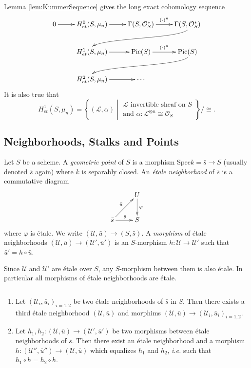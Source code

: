 Lemma \ref{lem:KummerSequence} gives the long exact cohomology sequence
$$
\xymatrix{
0  \ar[r] & H_{et}^0(S, \mu_n) \ar[r] & \Gamma(S, \mathcal{O}_S^*) \ar^{(\cdot)^n}[r] & \Gamma(S, \mathcal{O}_S^*) 
\ar@(rd,ul)[rdllllr]
\\ 
& H_{et}^1(S, \mu_n) \ar[r] & \text{Pic}(S) \ar^{(\cdot)^n}[r] & \text{Pic} (S) \ar@(rd,ul)[rdllllr] \\
& H_{et}^2(S, \mu_n) \ar[r] & \cdots 
}
$$
It is also true that
$$
H_{et}^1(S, \mu_n) = \left\{(\mathcal{L}, \alpha)\; 
\left| \; 
\begin{array}{c} 
\mathcal{L}\text{ invertible sheaf on } S  \\
\text{and }\alpha: \mathcal{L}^{\otimes n} \cong \mathcal{O}_S
\end{array}
\right.
\right\}
\Big/\cong.
$$

\subsection{Neighborhoods, Stalks and Points}

\begin{definition}
Let $S$ be a scheme. A \emph{geometric point} of $S$ is a morphism $\text{Spec} k = \bar s \to S$ (usually denoted $\bar s$ again)  where $k$ is separably closed. An \emph{\'etale neighborhood} of $\bar s$ is a commutative diagram
$$
\xymatrix{
& U \ar^{\varphi}[d] \\
{\bar s} \ar^{\bar s}[r] \ar^{\bar u}[ur] & S 
}
$$
where $\varphi$ is \'etale. We write $(\mathcal{U}, \bar u)\to (S, \bar s)$. A \emph{morphism} of \'etale neighborhoods $(\mathcal{U}, \bar u)\to (\mathcal{U}',\bar u')$ is an $S$-morphism $h: \mathcal{U}\to \mathcal{U}'$ such that $\bar u'=h\circ\bar u$. 
\end{definition}

\begin{remark}
Since $\mathcal{U}$ and $\mathcal{U}'$ are \'etale over $S$, any $S$-morphism between them is also \'etale. In particular all morphisms of \'etale neighborhoods are \'etale.
\end{remark}

\begin{lemma} $ $ \label{lem:CofinalityOfEtaleNbhds}
\begin{enumerate}
\item Let $(\mathcal{U}_i, \bar u_i)_{i=1, 2}$ be two \'etale neighborhoods of $\bar s$ in $S$. Then there exists a third \'etale neighborhood $(\mathcal{U}, \bar u)$ and morphims $(\mathcal{U}, \bar u) \to (\mathcal{U}_i, \bar u_i)_{i=1,2}$.
\item Let $h_1, h_2: (\mathcal{U}, \bar u) \to (\mathcal{U}', \bar u')$ be two morphisms between \'etale neighborhoods of $\bar s$. Then there exist an \'etale neighborhood and a morphism $h : (\mathcal{U}'', \bar u'')\to (\mathcal{U}, \bar u)$ which equalizes $h_1$ and $h_2$, {\it i.e.}  such that $h_1\circ h = h_2\circ h$.		
\end{enumerate}
\end{lemma}

